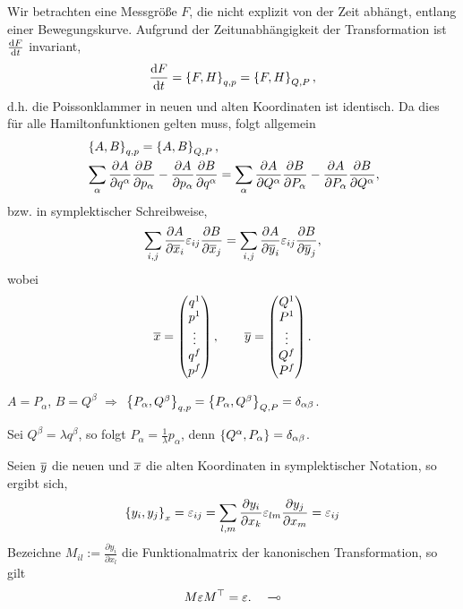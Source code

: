 Wir betrachten eine Messgröße $F$, die nicht explizit von der Zeit abhängt,
entlang einer Bewegungskurve. Aufgrund der Zeitunabhängigkeit der
Transformation ist $\frac{\mathrm{d} F}{\,\mathrm{d} t\,}$ invariant,
\begin{align*}
\frac{\mathrm{d} F}{\,\mathrm{d} t\,} = \left\{ F,H \right\}_{q,p} = \left\{ F,H \right\}_{Q,P},
\end{align*}
d.h. die Poissonklammer in neuen und alten Koordinaten ist identisch.
Da dies für alle Hamiltonfunktionen gelten muss, folgt allgemein
\begin{align*}
&\left\{ A,B \right\}_{q,p} = \left\{ A,B \right\}_{Q,P},\\
&\sum_\alpha \frac{\partial A}{\partial q^\alpha}\frac{\partial B}{\partial
p_\alpha} - \frac{\partial A}{\partial p_\alpha}\frac{\partial B}{\partial
q^\alpha}
=
\sum_\alpha \frac{\partial A}{\partial Q^\alpha}\frac{\partial B}{\partial
P_\alpha} - \frac{\partial A}{\partial P_\alpha}\frac{\partial B}{\partial
Q^\alpha},
\end{align*}
bzw. in symplektischer Schreibweise,
\begin{align*}
\sum_{i,j} \frac{\partial A}{\partial \overline{x}_i}\varepsilon_{ij}\frac{\partial
B}{\partial \overline{x}_j}
=
\sum_{i,j} \frac{\partial A}{\partial \overline{y}_i}\varepsilon_{ij}\frac{\partial
B}{\partial \overline{y}_j},
\end{align*}
wobei
\begin{align*}
\overline{x} =
\begin{pmatrix}
q^1\\p^1\\\vdots \\ q^f \\ p^f
\end{pmatrix},\qquad
\overline{y} =
\begin{pmatrix}
Q^1\\P^1\\\vdots \\ Q^f \\ P^f
\end{pmatrix}.
\end{align*}
\begin{bemn}[Spezialfall.]
$A=P_\alpha$, $B=Q^\beta$ $\Rightarrow$ $\left\{ P_\alpha,Q^\beta \right\}_{q,p} =
\left\{ P_\alpha, Q^\beta \right\}_{Q,P} = \delta_{\alpha\beta}$.

\begin{bsp}
Sei $Q^\beta = \lambda q^\beta$, so folgt $P_\alpha =
\frac{1}{\lambda}p_\alpha$, denn $\left\{ Q^\alpha,P_\alpha \right\} =
\delta_{\alpha\beta}$.\bsphere
\end{bsp}

Seien $\overline{y}$ die neuen und $\overline{x}$ die alten Koordinaten in symplektischer
Notation, so ergibt sich,
\begin{align*}
\left\{ y_i,y_j \right\}_x = \varepsilon_{ij} = \sum_{l,m} \frac{\partial y_i}{\partial
x_k}\varepsilon_{lm} \frac{\partial y_j}{\partial x_m} = \varepsilon_{ij}
\end{align*}
Bezeichne $M_{il}:=\frac{\partial y_i}{\partial x_l}$ die Funktionalmatrix der
kanonischen Transformation, so gilt
\begin{align*}
M\varepsilon M^\top = \varepsilon.\quad\multimap
\end{align*}
\end{bemn}

